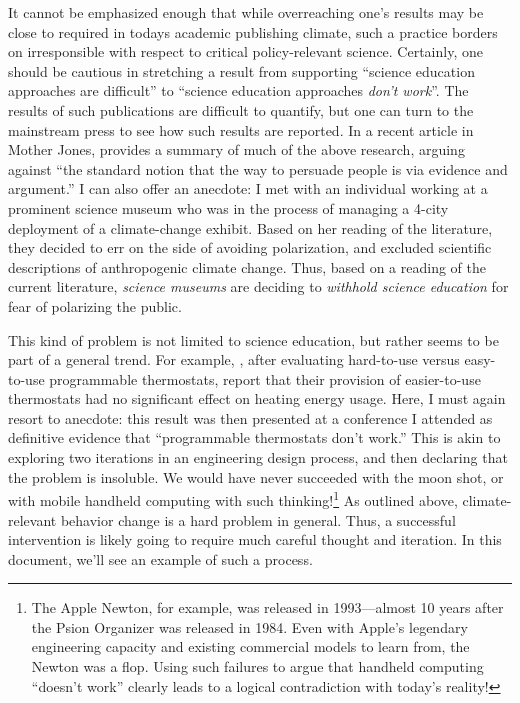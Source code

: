 It cannot be emphasized enough that while overreaching one's results may be
close to required in todays academic publishing climate, such a practice borders
on irresponsible with respect to critical policy-relevant science. Certainly,
one should be cautious in stretching a result from supporting “science education
approaches are difficult” to “science education approaches \emph{don't work}”.
The results of such publications are difficult to quantify, but one can turn to
the mainstream press to see how such results are reported. In a recent article
in Mother Jones, \textcite{mooney_science_2011} provides a summary of much of
the above research, arguing against “the standard notion that the way to
persuade people is via evidence and argument.” I can also offer an anecdote: I
met with an individual working at a prominent science museum who was in the
process of managing a 4-city deployment of a climate-change exhibit.  Based on
her reading of the literature, they decided to err on the side of avoiding
polarization, and excluded scientific descriptions of anthropogenic climate
change. Thus, based on a reading of the current literature, \emph{science
    museums} are deciding to \emph{withhold science education} for fear of
polarizing the public.

This kind of problem is not limited to science education, but rather seems to be
part of a general trend. For example, \textcite{sachs_field_2012}, after evaluating
hard-to-use versus easy-to-use programmable thermostats, report that their
provision of easier-to-use thermostats had no significant effect on heating
energy usage. Here, I must again resort to anecdote: this result was then
presented at a conference I attended as definitive evidence that “programmable
thermostats don't work.” 
This is akin to exploring two iterations in an
engineering design process, and then declaring that the problem is insoluble. We
would have never succeeded with the moon shot, or with mobile handheld computing
with such thinking!\footnote{The Apple Newton, for example, was released in
    1993---almost 10 years after the Psion Organizer was released in 1984. Even
    with Apple's legendary engineering capacity and existing commercial models
    to learn from, the Newton was a flop. Using such failures to argue that
    handheld computing “doesn't work” clearly leads to a logical contradiction
    with today's reality!}
As outlined above, climate-relevant behavior change is a hard problem in
general.  Thus, a successful intervention is likely going to require much
careful thought and iteration. In this document, we'll see an example of such a
process.

